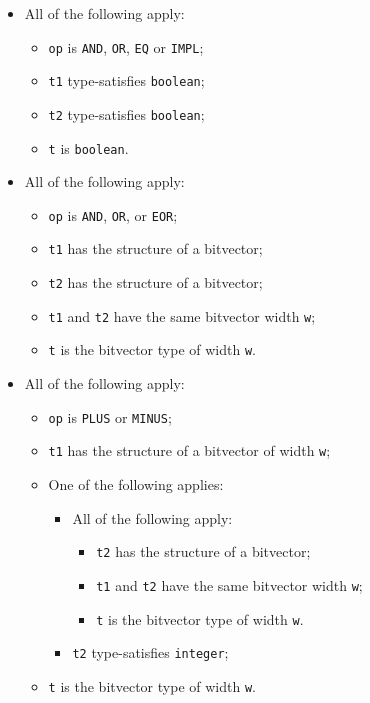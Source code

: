 \documentclass{book}
\begin{document}
\begin{itemize}
  \item All of the following apply:
    \begin{itemize}
    \item \texttt{op} is \texttt{AND}, \texttt{OR}, \texttt{EQ} or \texttt{IMPL};
    \item \texttt{t1} type-satisfies \texttt{boolean};
    \item \texttt{t2} type-satisfies \texttt{boolean};
    \item \texttt{t} is \texttt{boolean}.
    \end{itemize}

  \item All of the following apply:
    \begin{itemize}
    \item \texttt{op} is \texttt{AND}, \texttt{OR}, or \texttt{EOR};
    \item \texttt{t1} has the structure of a bitvector;
    \item \texttt{t2} has the structure of a bitvector;
    \item \texttt{t1} and \texttt{t2} have the same bitvector width \texttt{w};
    \item \texttt{t} is the bitvector type of width \texttt{w}.
    \end{itemize}

  \item All of the following apply:
    \begin{itemize}
    \item \texttt{op} is \texttt{PLUS} or \texttt{MINUS};
    \item \texttt{t1} has the structure of a bitvector of width \texttt{w};
    \item One of the following applies:
      \begin{itemize}
	    \item All of the following apply:
          \begin{itemize}
		    \item \texttt{t2} has the structure of a bitvector;
    		\item \texttt{t1} and \texttt{t2} have the same bitvector width \texttt{w};
    		\item \texttt{t} is the bitvector type of width \texttt{w}.
          \end{itemize}    
    	\item \texttt{t2} type-satisfies \texttt{integer};
      \end{itemize}    
    \item \texttt{t} is the bitvector type of width \texttt{w}.
    \end{itemize}


\end{itemize}
\end{document}
